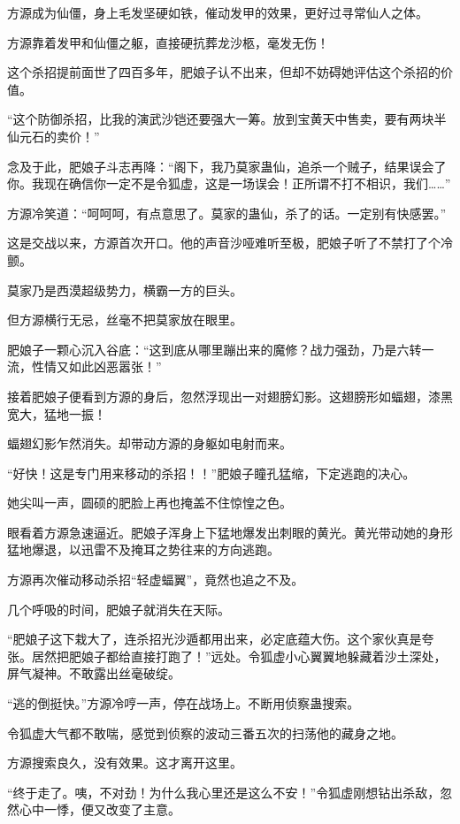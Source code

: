 \begin{this_body}
方源成为仙僵，身上毛发坚硬如铁，催动发甲的效果，更好过寻常仙人之体。

方源靠着发甲和仙僵之躯，直接硬抗葬龙沙柩，毫发无伤！

这个杀招提前面世了四百多年，肥娘子认不出来，但却不妨碍她评估这个杀招的价值。

“这个防御杀招，比我的演武沙铠还要强大一筹。放到宝黄天中售卖，要有两块半仙元石的卖价！”

念及于此，肥娘子斗志再降：“阁下，我乃莫家蛊仙，追杀一个贼子，结果误会了你。我现在确信你一定不是令狐虚，这是一场误会！正所谓不打不相识，我们……”

方源冷笑道：“呵呵呵，有点意思了。莫家的蛊仙，杀了的话。一定别有快感罢。”

这是交战以来，方源首次开口。他的声音沙哑难听至极，肥娘子听了不禁打了个冷颤。

莫家乃是西漠超级势力，横霸一方的巨头。

但方源横行无忌，丝毫不把莫家放在眼里。

肥娘子一颗心沉入谷底：“这到底从哪里蹦出来的魔修？战力强劲，乃是六转一流，性情又如此凶恶嚣张！”

接着肥娘子便看到方源的身后，忽然浮现出一对翅膀幻影。这翅膀形如蝠翅，漆黑宽大，猛地一振！

蝠翅幻影乍然消失。却带动方源的身躯如电射而来。

“好快！这是专门用来移动的杀招！！”肥娘子瞳孔猛缩，下定逃跑的决心。

她尖叫一声，圆硕的肥脸上再也掩盖不住惊惶之色。

眼看着方源急速逼近。肥娘子浑身上下猛地爆发出刺眼的黄光。黄光带动她的身形猛地爆退，以迅雷不及掩耳之势往来的方向逃跑。

方源再次催动移动杀招“轻虚蝠翼”，竟然也追之不及。

几个呼吸的时间，肥娘子就消失在天际。

“肥娘子这下栽大了，连杀招光沙遁都用出来，必定底蕴大伤。这个家伙真是夸张。居然把肥娘子都给直接打跑了！”远处。令狐虚小心翼翼地躲藏着沙土深处，屏气凝神。不敢露出丝毫破绽。

“逃的倒挺快。”方源冷哼一声，停在战场上。不断用侦察蛊搜索。

令狐虚大气都不敢喘，感觉到侦察的波动三番五次的扫荡他的藏身之地。

方源搜索良久，没有效果。这才离开这里。

“终于走了。咦，不对劲！为什么我心里还是这么不安！”令狐虚刚想钻出杀敌，忽然心中一悸，便又改变了主意。


\end{this_body}
